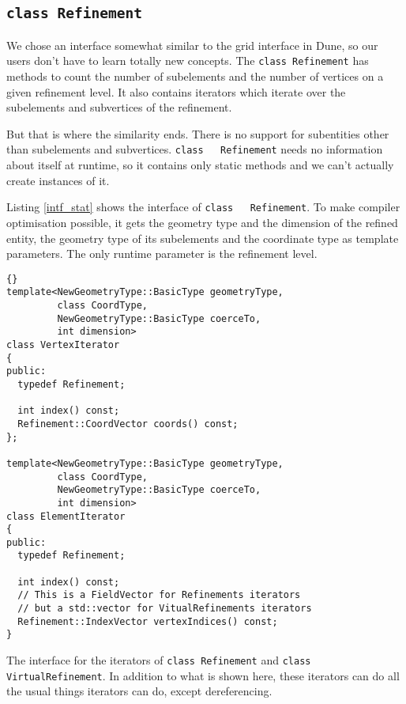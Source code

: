 \documentclass[english,a4paper]{article}
\newcommand{\code}[1]{\textnormal{\lstinline{#1}}}
\begin{document}
\subsection{\code{class Refinement}}

We chose an interface somewhat similar to the grid interface in Dune,
so our users don't have to learn totally new concepts.  The
\code{class Refinement} has methods to count the number of subelements
and the number of vertices on a given refinement level.  It also
contains iterators which iterate over the subelements and subvertices
of the refinement.

But that is where the similarity ends.  There is no support for
subentities other than subelements and subvertices.  \code{class
  Refinement} needs no information about itself at runtime, so it
contains only static methods and we can't actually create instances of
it.

Listing \ref{intf_stat} shows the interface of \code{class
  Refinement}.  To make compiler optimisation possible, it gets the
geometry type and the dimension of the refined entity, the geometry
type of its subelements and the coordinate type as template
parameters.  The only runtime parameter is the refinement level.

\begin{Listing}
  \begin{lstlisting}{}
template<NewGeometryType::BasicType geometryType,
         class CoordType,
         NewGeometryType::BasicType coerceTo,
         int dimension>
class VertexIterator
{
public:
  typedef Refinement;

  int index() const;
  Refinement::CoordVector coords() const;
};

template<NewGeometryType::BasicType geometryType,
         class CoordType,
         NewGeometryType::BasicType coerceTo,
         int dimension>
class ElementIterator
{
public:
  typedef Refinement;

  int index() const;
  // This is a FieldVector for Refinements iterators
  // but a std::vector for VitualRefinements iterators
  Refinement::IndexVector vertexIndices() const;
}
  \end{lstlisting}
  \caption{\label{intf_iter}The interface for the iterators of
    \code{class Refinement} and \code{class} \code{VirtualRefinement}.
    In addition to what is shown here, these iterators can do all the
    usual things iterators can do, except dereferencing.}
\end{Listing}
\end{document}
